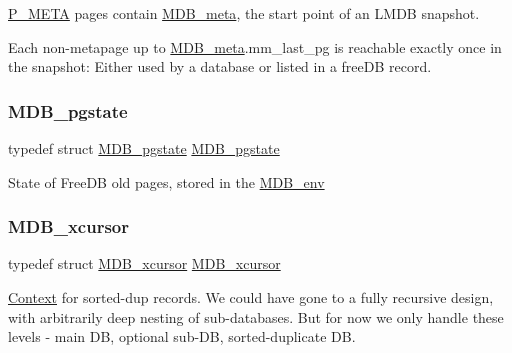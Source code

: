 \mbox{\hyperlink{group__mdb__page_ga3d5d5c4af2527d4d9230d414230580ac}{P\+\_\+\+M\+E\+TA}} pages contain \mbox{\hyperlink{struct_m_d_b__meta}{M\+D\+B\+\_\+meta}}, the start point of an L\+M\+DB snapshot.

Each non-\/metapage up to \mbox{\hyperlink{struct_m_d_b__meta}{M\+D\+B\+\_\+meta}}.mm\+\_\+last\+\_\+pg is reachable exactly once in the snapshot\+: Either used by a database or listed in a free\+DB record. \mbox{\label{group__internal_gaaf0ef2e223705599fedc655ce6512319}} 
\subsubsection{\texorpdfstring{M\+D\+B\+\_\+pgstate}{MDB\_pgstate}}
{\footnotesize\ttfamily typedef struct \mbox{\hyperlink{struct_m_d_b__pgstate}{M\+D\+B\+\_\+pgstate}}  \mbox{\hyperlink{struct_m_d_b__pgstate}{M\+D\+B\+\_\+pgstate}}}

State of Free\+DB old pages, stored in the \mbox{\hyperlink{struct_m_d_b__env}{M\+D\+B\+\_\+env}} \mbox{\label{group__internal_ga5840a44a24890c3b76666d2557c37e1d}} 
\subsubsection{\texorpdfstring{M\+D\+B\+\_\+xcursor}{MDB\_xcursor}}
{\footnotesize\ttfamily typedef struct \mbox{\hyperlink{struct_m_d_b__xcursor}{M\+D\+B\+\_\+xcursor}}  \mbox{\hyperlink{struct_m_d_b__xcursor}{M\+D\+B\+\_\+xcursor}}}

\mbox{\hyperlink{struct_context}{Context}} for sorted-\/dup records. We could have gone to a fully recursive design, with arbitrarily deep nesting of sub-\/databases. But for now we only handle these levels -\/ main DB, optional sub-\/\+DB, sorted-\/duplicate DB. \mbox{\label{group__internal_gadb65f0424c9d3827bf6409087ad555cd}} 
